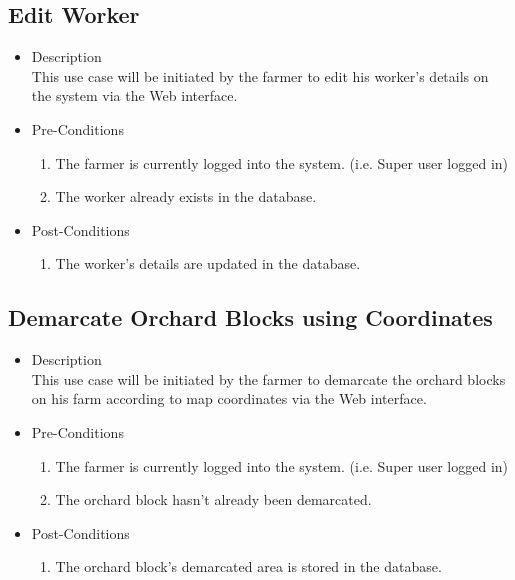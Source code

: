 \documentclass[11pt,fleqn]{book} %
\begin{document}
	\subsection{Edit Worker}
	\begin{itemize}
		\item Description\\
		This use case will be initiated by the farmer to edit his worker’s details on the system via the Web interface.
		\item Pre-Conditions
		\begin{enumerate}
			\item The farmer is currently logged into the system. (i.e. Super user logged in)
			\item The worker already exists in the database.					
		\end{enumerate}
		\item Post-Conditions
		\begin{enumerate}
			\item The worker’s details are updated in the database.
		\end{enumerate}
	\end{itemize}
	
	\subsection{Demarcate Orchard Blocks using Coordinates}
	\begin{itemize}
		\item Description\\
		This use case will be initiated by the farmer to demarcate the orchard blocks on his farm according to map coordinates via the Web interface.
		\item Pre-Conditions
		\begin{enumerate}
			\item The farmer is currently logged into the system. (i.e. Super user logged in)
			\item The orchard block hasn’t already been demarcated.
		\end{enumerate}
		\item Post-Conditions
		\begin{enumerate}
			\item The orchard block’s demarcated area is stored in the database.		
		\end{enumerate}
	\end{itemize}
	
\end{document}
